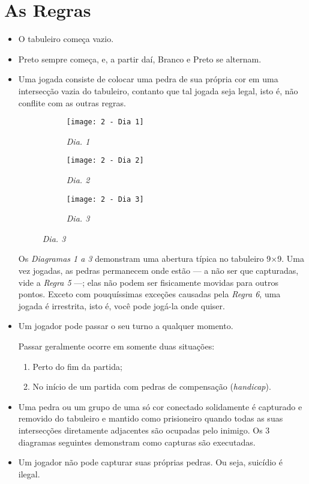 \chapter{As Regras}\label{chap:regras}

\begin{itemize}
    \item[\textbf{Regra 1}] O tabuleiro começa vazio.
    \item[\textbf{Regra 2}] Preto sempre começa, e, a partir daí, Branco e Preto se alternam. 
    \item[\textbf{Regra 3}] Uma jogada consiste de colocar uma pedra de sua própria cor em uma intersecção vazia do tabuleiro, contanto que tal jogada seja legal, isto é, não conflite com as outras regras.

    \begin{figure}[h]
        \centering
        \begin{subfigure}{.3\textwidth}
            \centering
            \texttt{[image: 2 - Dia 1]}
            \caption*{\emph{Dia. 1}}
        \end{subfigure}
        \begin{subfigure}{.3\textwidth}
            \centering
            \texttt{[image: 2 - Dia 2]}
            \caption*{\emph{Dia. 2}}
        \end{subfigure}
        \begin{subfigure}{.3\textwidth}
            \centering
            \texttt{[image: 2 - Dia 3]}
            \caption*{\emph{Dia. 3}}
        \end{subfigure}
    \end{figure}

    Os \emph{Diagramas 1 a 3} demonstram uma abertura típica no tabuleiro 9\(\times\)9. Uma vez jogadas, as pedras permanecem onde estão --- a não ser que capturadas, vide a \emph{Regra 5} ---; elas não podem ser fisicamente movidas para outros pontos. Exceto com pouquíssimas exceções causadas pela \emph{Regra 6}, uma jogada é irrestrita, isto é, você pode jogá-la onde quiser.
    \item[\textbf{Regra 4}] Um jogador pode passar o seu turno a qualquer momento.
    
    Passar geralmente ocorre em somente duas situações:
        
    \begin{enumerate}
        \item Perto do fim da partida;
        \item No início de um partida com pedras de compensação (\emph{handicap}).
    \end{enumerate}
    \item[\textbf{Regra 5}] Uma pedra ou um grupo de uma só cor conectado solidamente é capturado e removido do tabuleiro e mantido como prisioneiro quando todas as suas intersecções diretamente adjacentes são ocupadas pelo inimigo. Os 3 diagramas seguintes demonstram como capturas são executadas.
    \item[\textbf{Regra 6}] Um jogador não pode capturar suas próprias pedras. Ou seja, suicídio é ilegal.
\end{itemize}

